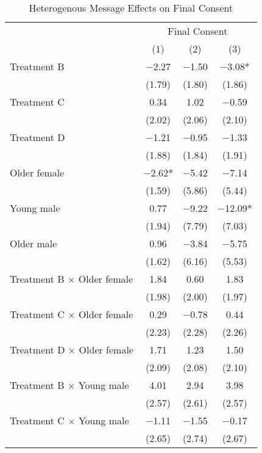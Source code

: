 \documentclass[12pt, a4paper]{article}
\begin{document}
\begin{table}[H]

\caption{\label{tab:consent-lm-interaction-reg}Heterogenous Message Effects on Final Consent}
\centering
\fontsize{8}{10}\selectfont
\begin{threeparttable}
\begin{tabular}[t]{lccc}
\toprule
\multicolumn{1}{c}{ } & \multicolumn{3}{c}{Final Consent} \\
\cmidrule(l{3pt}r{3pt}){2-4}
  & (1) & (2) & (3)\\
\midrule
Treatment B & \num{-2.27} & \num{-1.50} & \num{-3.08}*\\
 & (\num{1.79}) & (\num{1.80}) & (\num{1.86})\\
Treatment C & \num{0.34} & \num{1.02} & \num{-0.59}\\
 & (\num{2.02}) & (\num{2.06}) & (\num{2.10})\\
Treatment D & \num{-1.21} & \num{-0.95} & \num{-1.33}\\
 & (\num{1.88}) & (\num{1.84}) & (\num{1.91})\\
Older female & \num{-2.62}* & \num{-5.42} & \num{-7.14}\\
 & (\num{1.59}) & (\num{5.86}) & (\num{5.44})\\
Young male & \num{0.77} & \num{-9.22} & \num{-12.09}*\\
 & (\num{1.94}) & (\num{7.79}) & (\num{7.03})\\
Older male & \num{0.96} & \num{-3.84} & \num{-5.75}\\
 & (\num{1.62}) & (\num{6.16}) & (\num{5.53})\\
Treatment B $\times$ Older female & \num{1.84} & \num{0.60} & \num{1.83}\\
 & (\num{1.98}) & (\num{2.00}) & (\num{1.97})\\
Treatment C $\times$ Older female & \num{0.29} & \num{-0.78} & \num{0.44}\\
 & (\num{2.23}) & (\num{2.28}) & (\num{2.26})\\
Treatment D $\times$ Older female & \num{1.71} & \num{1.23} & \num{1.50}\\
 & (\num{2.09}) & (\num{2.08}) & (\num{2.10})\\
Treatment B $\times$ Young male & \num{4.01} & \num{2.94} & \num{3.98}\\
 & (\num{2.57}) & (\num{2.61}) & (\num{2.57})\\
Treatment C $\times$ Young male & \num{-1.11} & \num{-1.55} & \num{-0.17}\\
 & (\num{2.65}) & (\num{2.74}) & (\num{2.67})\\

\end{tabular}
\end{threeparttable}
\end{table}
\end{document}
